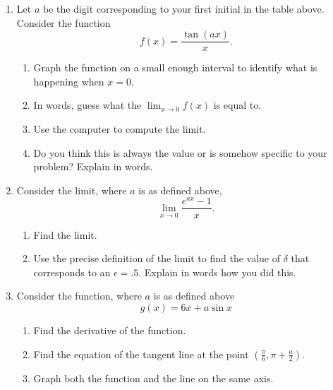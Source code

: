 \documentclass[11pt]{article}
\begin{document}
\begin{enumerate}
\item Let $a$ be the digit corresponding to your first initial in the table above.  Consider the function 
\[f(x)=\frac{\tan (ax)}x.\]
\begin{enumerate}
\item Graph the function on a small enough interval to identify what is happening when $x=0$.
\item In words, guess what the $\lim_{x\to0}f(x)$ is equal to.
\item Use the computer to compute the limit.
\item Do you think this is always the value or is somehow specific to your problem?  Explain in words.
\end{enumerate}




\item Consider the limit, where $a$ is as defined above,
\[
\lim_{x\to0}\frac{e^{ax}-1}{x}.
\]
\begin{enumerate}
\item Find the limit.
\item Use the precise definition of the limit to find the value of $\delta$ that corresponds to an $\epsilon=.5$. Explain in words how you did this.

\end{enumerate}
\item Consider the function, where $a$ is as defined above
\[
g(x)=6x+a\sin x
\]
\begin{enumerate}
\item Find the derivative of the function.
\item Find the equation of the tangent line at the point $\left(\frac\pi6,\pi+\frac a2\right)$.
\item Graph both the function and the line on the same axis.
\end{enumerate}
\end{enumerate}
\end{document}
